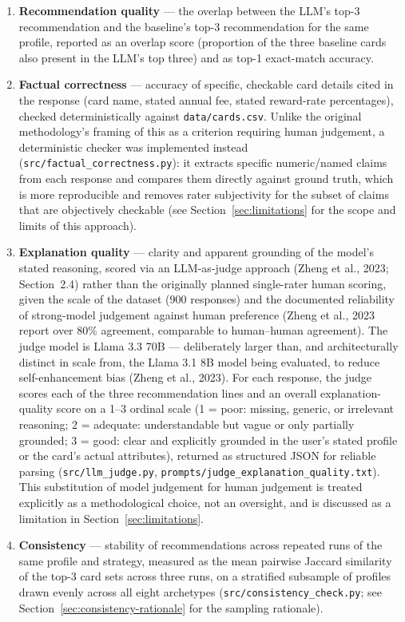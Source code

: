 \begin{enumerate}
    \item \textbf{Recommendation quality} --- the overlap between the LLM's top-3 recommendation and the baseline's top-3 recommendation for the same profile, reported as an overlap score (proportion of the three baseline cards also present in the LLM's top three) and as top-1 exact-match accuracy.
    \item \textbf{Factual correctness} --- accuracy of specific, checkable card details cited in the response (card name, stated annual fee, stated reward-rate percentages), checked deterministically against \texttt{data/cards.csv}. Unlike the original methodology's framing of this as a criterion requiring human judgement, a deterministic checker was implemented instead (\texttt{src/factual\_correctness.py}): it extracts specific numeric/named claims from each response and compares them directly against ground truth, which is more reproducible and removes rater subjectivity for the subset of claims that are objectively checkable (see Section~\ref{sec:limitations} for the scope and limits of this approach).
    \item \textbf{Explanation quality} --- clarity and apparent grounding of the model's stated reasoning, scored via an LLM-as-judge approach (Zheng et al., 2023; Section~2.4) rather than the originally planned single-rater human scoring, given the scale of the dataset (900 responses) and the documented reliability of strong-model judgement against human preference (Zheng et al., 2023 report over 80\% agreement, comparable to human--human agreement). The judge model is Llama 3.3 70B --- deliberately larger than, and architecturally distinct in scale from, the Llama 3.1 8B model being evaluated, to reduce self-enhancement bias (Zheng et al., 2023). For each response, the judge scores each of the three recommendation lines and an overall explanation-quality score on a 1--3 ordinal scale (1 = poor: missing, generic, or irrelevant reasoning; 2 = adequate: understandable but vague or only partially grounded; 3 = good: clear and explicitly grounded in the user's stated profile or the card's actual attributes), returned as structured JSON for reliable parsing (\texttt{src/llm\_judge.py}, \texttt{prompts/judge\_explanation\_quality.txt}). This substitution of model judgement for human judgement is treated explicitly as a methodological choice, not an oversight, and is discussed as a limitation in Section~\ref{sec:limitations}.
    \item \textbf{Consistency} --- stability of recommendations across repeated runs of the same profile and strategy, measured as the mean pairwise Jaccard similarity of the top-3 card sets across three runs, on a stratified subsample of profiles drawn evenly across all eight archetypes (\texttt{src/consistency\_check.py}; see Section~\ref{sec:consistency-rationale} for the sampling rationale).
\end{enumerate}

